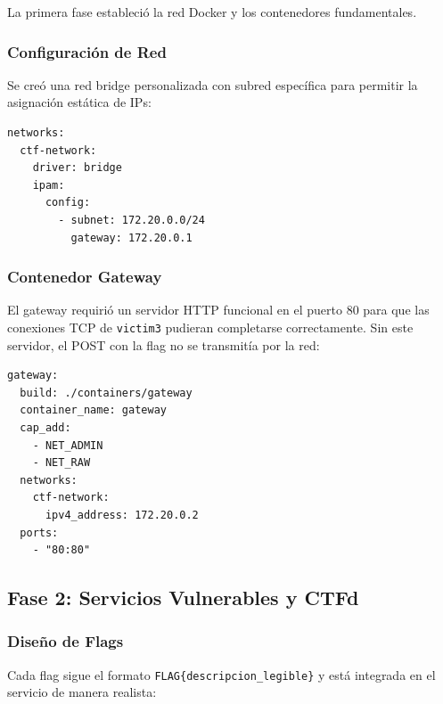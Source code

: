 \documentclass[12pt, a4paper]{article}
\begin{document}
La primera fase estableci\'o la red Docker y los contenedores fundamentales.

\subsubsection{Configuraci\'on de Red}

Se cre\'o una red bridge personalizada con subred espec\'ifica para permitir la asignaci\'on est\'atica de IPs:

\begin{lstlisting}[style=yamlstyle, caption={Definici\'on de la red en docker-compose.yml}]
networks:
  ctf-network:
    driver: bridge
    ipam:
      config:
        - subnet: 172.20.0.0/24
          gateway: 172.20.0.1
\end{lstlisting}

\subsubsection{Contenedor Gateway}

El gateway requiri\'o un servidor HTTP funcional en el puerto 80 para que las conexiones TCP de \texttt{victim3} pudieran completarse correctamente. Sin este servidor, el POST con la flag no se transmit\'ia por la red:

\begin{lstlisting}[style=yamlstyle, caption={Configuraci\'on del contenedor gateway}]
gateway:
  build: ./containers/gateway
  container_name: gateway
  cap_add:
    - NET_ADMIN
    - NET_RAW
  networks:
    ctf-network:
      ipv4_address: 172.20.0.2
  ports:
    - "80:80"
\end{lstlisting}

\subsection{Fase 2: Servicios Vulnerables y CTFd}

\subsubsection{Dise\~no de Flags}

Cada flag sigue el formato \texttt{FLAG\{descripcion\_legible\}} y est\'a integrada en el servicio de manera realista:
\end{document}
